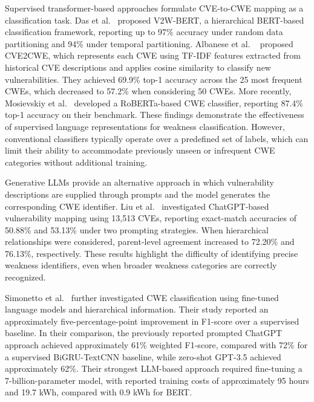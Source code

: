 \documentclass[conference,compsoc]{IEEEtran}
\begin{document}
Supervised transformer-based approaches formulate
CVE-to-CWE mapping as a classification task.
Das et al.~\cite{das2021v2w} proposed V2W-BERT,
a hierarchical BERT-based classification framework,
reporting up to 97\% accuracy under random data
partitioning and 94\% under temporal partitioning. Albanese et al. ~\cite{albanese2024cve2cwe} proposed CVE2CWE, which represents each CWE using
TF-IDF features extracted from historical CVE
descriptions and applies cosine similarity to
classify new vulnerabilities. They achieved
69.9\% top-1 accuracy across the 25 most frequent
CWEs, which decreased to 57.2\% when considering
50 CWEs. More recently, Mosievskiy et
al.~\cite{mosievskiy2026roberta} developed a
RoBERTa-based CWE classifier, reporting 87.4\%
top-1 accuracy on their benchmark. These findings
demonstrate the effectiveness of supervised
language representations for weakness
classification. However, conventional classifiers
typically operate over a predefined set of labels,
which can limit their ability to accommodate
previously unseen or infrequent CWE categories
without additional training.

Generative LLMs provide an alternative approach in
which vulnerability descriptions are supplied through
prompts and the model generates the corresponding CWE
identifier. Liu et al.~\cite{liu2023not}
investigated ChatGPT-based vulnerability mapping
using 13,513 CVEs, reporting exact-match accuracies
of 50.88\% and 53.13\% under two prompting
strategies. When hierarchical relationships were
considered, parent-level agreement increased to
72.20\% and 76.13\%, respectively. These results
highlight the difficulty of identifying precise
weakness identifiers, even when broader weakness
categories are correctly recognized.

Simonetto et al.~\cite{simonetto2026knowing}
further investigated CWE classification using
fine-tuned language models and hierarchical
information. Their study reported an approximately
five-percentage-point improvement in F1-score over
a supervised baseline. In their comparison,
the previously reported prompted ChatGPT approach
achieved approximately 61\% weighted F1-score,
compared with 72\% for a supervised
BiGRU-TextCNN baseline, while zero-shot GPT-3.5
achieved approximately 62\%. Their strongest
LLM-based approach required fine-tuning a
7-billion-parameter model, with reported training
costs of approximately 95 hours and 19.7 kWh,
compared with 0.9 kWh for BERT.
\end{document}
